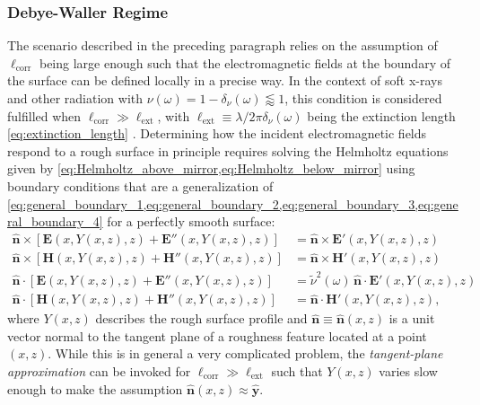 \subsubsection{Debye-Waller Regime}\label{sec:DW_factor}
The scenario described in the preceding paragraph relies on the assumption of $\ell_{\text{corr}}$ being large enough such that the electromagnetic fields at the boundary of the surface can be defined locally in a precise way. 
In the context of soft x-rays and other radiation with $\nu (\omega) = 1 - \delta_{\nu} (\omega) \lessapprox 1$, this condition is considered fulfilled when $\ell_{\text{corr}} \gg \ell_{\text{ext}}$, with $\ell_{\text{ext}} \equiv \lambda / 2 \pi \delta_{\nu} (\omega)$ being the extinction length \cref{eq:extinction_length} \cite[\emph{cf.\@} \cref{eq:extinction_length}]{deBergevin09,Gibaud2009}. 
Determining how the incident electromagnetic fields respond to a rough surface in principle requires solving the Helmholtz equations given by \cref{eq:Helmholtz_above_mirror,eq:Helmholtz_below_mirror} using boundary conditions that are a generalization of \cref{eq:general_boundary_1,eq:general_boundary_2,eq:general_boundary_3,eq:general_boundary_4} for a perfectly smooth surface: 
\begin{subequations}
\begin{align}
 \mathbold{\hat{n}} \times \left[ \mathbold{E} \left( x, Y(x,z), z \right) + \mathbold{E''} \left( x, Y(x,z), z \right) \right] &= \mathbold{\hat{n}} \times \mathbold{E'} \left( x, Y(x,z), z \right) \label{eq:rough_boundary_1} \\
 \mathbold{\hat{n}} \times \left[\mathbold{H} \left( x, Y(x,z), z \right)  + \mathbold{H''} \left( x, Y(x,z), z \right) \right] &= \mathbold{\hat{n}} \times \mathbold{H'} \left( x, Y(x,z), z \right)  \label{eq:rough_boundary_2} \\
 \mathbold{\hat{n}} \cdot \left[ \mathbold{E} \left( x, Y(x,z), z \right) + \mathbold{E''} \left( x, Y(x,z), z \right) \right] &= \tilde{\nu}^2 (\omega) \, \mathbold{\hat{n}} \cdot \mathbold{E'} \left( x, Y(x,z), z \right) \label{eq:rough_boundary_3} \\
 \mathbold{\hat{n}} \cdot \left[ \mathbold{H} \left( x, Y(x,z), z \right) + \mathbold{H''} \left( x, Y(x,z), z \right) \right] &= \mathbold{\hat{n}} \cdot \mathbold{H'} \left( x, Y(x,z), z \right) \label{eq:rough_boundary_4} , 
 \end{align}
\end{subequations}
where $Y(x,z)$ describes the rough surface profile and $\mathbold{\hat{n}} \equiv \mathbold{\hat{n}} (x,z)$ is a unit vector normal to the tangent plane of a roughness feature located at a point $(x,z)$. 
While this is in general a very complicated problem, the \emph{tangent-plane approximation} can be invoked for $\ell_{\text{corr}} \gg \ell_{\text{ext}}$ such that $Y(x,z)$ varies slow enough to make the assumption $\mathbold{\hat{n}} (x,z) \approx \mathbold{\hat{y}}$. 

